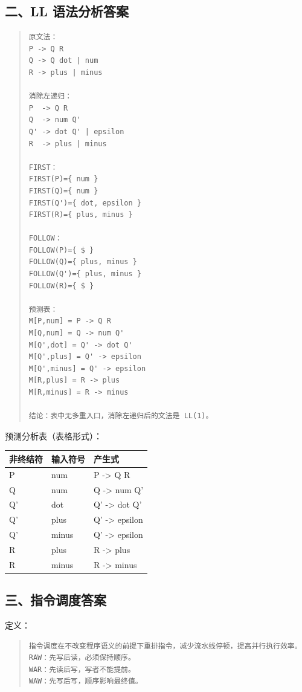 \documentclass[UTF8,zihao=-4]{ctexart}
\begin{document}
\subsection{二、LL 语法分析答案}


\begin{quote}
\footnotesize
\begin{verbatim}
原文法：
P -> Q R
Q -> Q dot | num
R -> plus | minus

消除左递归：
P  -> Q R
Q  -> num Q'
Q' -> dot Q' | epsilon
R  -> plus | minus

FIRST：
FIRST(P)={ num }
FIRST(Q)={ num }
FIRST(Q')={ dot, epsilon }
FIRST(R)={ plus, minus }

FOLLOW：
FOLLOW(P)={ $ }
FOLLOW(Q)={ plus, minus }
FOLLOW(Q')={ plus, minus }
FOLLOW(R)={ $ }

预测表：
M[P,num] = P -> Q R
M[Q,num] = Q -> num Q'
M[Q',dot] = Q' -> dot Q'
M[Q',plus] = Q' -> epsilon
M[Q',minus] = Q' -> epsilon
M[R,plus] = R -> plus
M[R,minus] = R -> minus

结论：表中无多重入口，消除左递归后的文法是 LL(1)。
\end{verbatim}
\end{quote}

预测分析表（表格形式）：

\begin{center}
\footnotesize
\begin{tabular}{lll}
\hline
非终结符 & 输入符号 & 产生式 \\
\hline
P & num & P -> Q R \\
Q & num & Q -> num Q' \\
Q' & dot & Q' -> dot Q' \\
Q' & plus & Q' -> epsilon \\
Q' & minus & Q' -> epsilon \\
R & plus & R -> plus \\
R & minus & R -> minus \\
\hline
\end{tabular}
\end{center}



\subsection{三、指令调度答案}


定义：


\begin{quote}
\footnotesize
\begin{verbatim}
指令调度在不改变程序语义的前提下重排指令，减少流水线停顿，提高并行执行效率。
RAW：先写后读，必须保持顺序。
WAR：先读后写，写者不能提前。
WAW：先写后写，顺序影响最终值。
\end{verbatim}
\end{quote}
\end{document}
